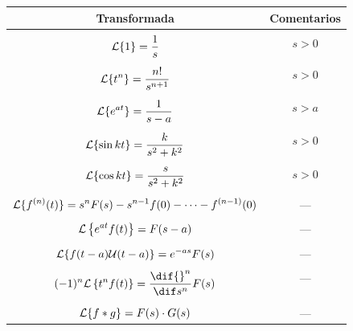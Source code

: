 \documentclass[../ecuaciones_diferenciales.tex]{subfiles}
\begin{document}
\begin{figure}[ht]
	\centering
	\begin{tabular}{c|c}
		Transformada                                                 & Comentarios
		\\[0.7em] \hline \\[-1.0em]
		\(\displaystyle \mathcal{L}\{1\} = \frac{1}{s}\)                      & \(s>0\)
		\\[0.7em] \hline \\[-1.0em]
		\(\displaystyle \mathcal{L}\{t^n\} = \frac{n!}{s^{n+1}}\)             & \(s>0\)
		\\[0.7em] \hline \\[-1.0em]
		\(\displaystyle \mathcal{L}\{e^{at}\} = \frac{1}{s-a}\)               & \(s>a\)
		\\[0.7em] \hline \\[-1.0em]
		\(\displaystyle \mathcal{L}\{\sin kt\} = \frac{k}{s^2+k^2}\)          & \(s>0\)
		\\[0.7em] \hline \\[-1.0em]
		\(\displaystyle \mathcal{L}\{\cos kt\} = \frac{s}{s^2+k^2}\)          & \(s>0\)
		\\[0.7em] \hline \\[-1.0em]
		\(\displaystyle \mathcal{L}\{f^{(n)}(t)\} = s^nF(s) - s^{n-1}f(0) - \cdots -
		f^{(n-1)}(0)\)                                               & ---
		\\[0.4em] \hline \\[-1.0em]
		\(\displaystyle \mathcal{L}\left\{e^{at}f(t)\right\} = F(s-a)\)       & ---
		\\[0.4em] \hline \\[-1.0em]
		\(\displaystyle \mathcal{L}\{f(t-a)\mathcal{U}(t-a)\} = e^{-as}F(s)\) & ---
		\\[0.4em] \hline \\[-1.0em]
		\(\displaystyle (-1)^n\L\left\{t^nf(t)\right\} = \frac{\dif {}^n}{\dif s^n}
		F(s)\)                                                       & ---
		\\[0.7em] \hline \\[-1.0em]
		\(\displaystyle \mathcal{L}\{f \ast g\} = F(s) \cdot G(s)\)           & ---
	\end{tabular}
\end{figure}
\end{document}
